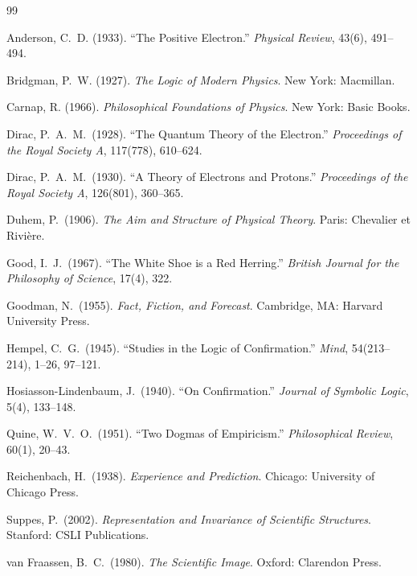 \documentclass[11pt]{book}
\begin{document}
\begin{thebibliography}{99}

 Anderson, C.\ D. (1933). ``The Positive Electron.'' \emph{Physical Review}, 43(6), 491--494.

 Bridgman, P.\ W. (1927). \emph{The Logic of Modern Physics}. New York: Macmillan.

 Carnap, R. (1966). \emph{Philosophical Foundations of Physics}. New York: Basic Books.

 Dirac, P.\ A.\ M.\ (1928). ``The Quantum Theory of the Electron.'' \emph{Proceedings of the Royal Society A}, 117(778), 610--624.

 Dirac, P.\ A.\ M.\ (1930). ``A Theory of Electrons and Protons.'' \emph{Proceedings of the Royal Society A}, 126(801), 360--365.

 Duhem, P.\ (1906). \emph{The Aim and Structure of Physical Theory}. Paris: Chevalier et Rivi\`ere.

 Good, I.\ J.\ (1967). ``The White Shoe is a Red Herring.'' \emph{British Journal for the Philosophy of Science}, 17(4), 322.

 Goodman, N.\ (1955). \emph{Fact, Fiction, and Forecast}. Cambridge, MA: Harvard University Press.

 Hempel, C.\ G.\ (1945). ``Studies in the Logic of Confirmation.'' \emph{Mind}, 54(213--214), 1--26, 97--121.

 Hosiasson-Lindenbaum, J.\ (1940). ``On Confirmation.'' \emph{Journal of Symbolic Logic}, 5(4), 133--148.

 Quine, W.\ V.\ O.\ (1951). ``Two Dogmas of Empiricism.'' \emph{Philosophical Review}, 60(1), 20--43.

 Reichenbach, H.\ (1938). \emph{Experience and Prediction}. Chicago: University of Chicago Press.

 Suppes, P.\ (2002). \emph{Representation and Invariance of Scientific Structures}. Stanford: CSLI Publications.

 van Fraassen, B.\ C.\ (1980). \emph{The Scientific Image}. Oxford: Clarendon Press.

\end{thebibliography}
\end{document}
